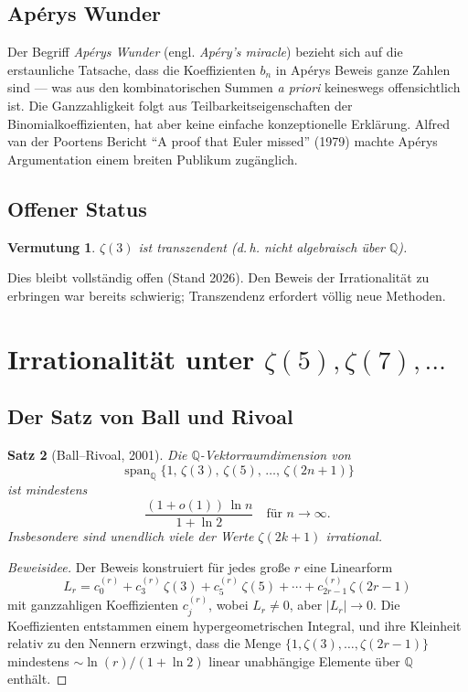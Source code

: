 \documentclass[12pt,a4paper]{amsart}
\newtheorem{theorem}{Satz}[section]
\newtheorem{vermutung}[theorem]{Vermutung}
\theoremstyle{definition}
\theoremstyle{remark}
\begin{document}
\subsection{Apérys Wunder}

Der Begriff \emph{Apérys Wunder} (engl. \emph{Apéry's miracle}) bezieht sich auf
die erstaunliche Tatsache, dass die Koeffizienten $b_n$ in Apérys Beweis ganze
Zahlen sind --- was aus den kombinatorischen Summen \emph{a priori} keineswegs
offensichtlich ist. Die Ganzzahligkeit folgt aus Teilbarkeitseigenschaften der
Binomialkoeffizienten, hat aber keine einfache konzeptionelle Erklärung.
Alfred van der Poortens Bericht ``A proof that Euler missed'' (1979) machte
Apérys Argumentation einem breiten Publikum zugänglich.

\subsection{Offener Status}

\begin{vermutung}
  $\zeta(3)$ ist transzendent (d.\,h. nicht algebraisch über $\mathbb{Q}$).
\end{vermutung}

Dies bleibt vollständig offen (Stand 2026). Den Beweis der Irrationalität zu
erbringen war bereits schwierig; Transzendenz erfordert völlig neue Methoden.

\section{Irrationalität unter $\zeta(5), \zeta(7), \ldots$}

\subsection{Der Satz von Ball und Rivoal}

\begin{theorem}[Ball--Rivoal, 2001]\label{thm:ball-rivoal}
  Die $\mathbb{Q}$-Vektorraumdimension von
  \[
    \operatorname{span}_{\mathbb{Q}}\{1,\, \zeta(3),\, \zeta(5),\, \ldots,\,
    \zeta(2n+1)\}
  \]
  ist mindestens
  \[
    \frac{(1 + o(1))\,\ln n}{1 + \ln 2}
    \quad \text{für } n \to \infty.
  \]
  Insbesondere sind unendlich viele der Werte $\zeta(2k+1)$ irrational.
\end{theorem}

\begin{proof}[Beweisidee]
  Der Beweis konstruiert für jedes große $r$ eine Linearform
  \[
    L_r = c_0^{(r)} + c_3^{(r)}\,\zeta(3) + c_5^{(r)}\,\zeta(5) + \cdots
          + c_{2r-1}^{(r)}\,\zeta(2r-1)
  \]
  mit ganzzahligen Koeffizienten $c_j^{(r)}$, wobei $L_r \neq 0$, aber
  $|L_r| \to 0$. Die Koeffizienten entstammen einem hypergeometrischen Integral,
  und ihre Kleinheit relativ zu den Nennern erzwingt, dass die Menge
  $\{1, \zeta(3), \ldots, \zeta(2r-1)\}$ mindestens $\sim \ln(r)/(1 + \ln 2)$
  linear unabhängige Elemente über $\mathbb{Q}$ enthält.
\end{proof}
\end{document}
